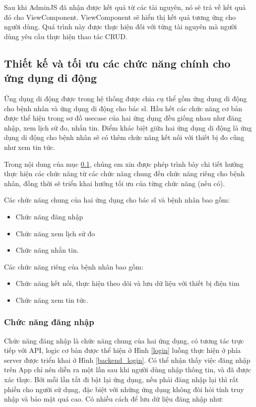 Sau khi AdminJS đã nhận được kết quả từ các tài nguyên, nó sẽ trả về kết quả đó cho ViewComponent. ViewComponent sẽ hiển thị kết quả tương ứng cho người dùng. Quá trình này được thực hiện đối với từng tài nguyên mà người dùng yêu cầu thực hiện thao tác CRUD.





\subsection{Thiết kế và tối ưu các chức năng chính cho ứng dụng di động}
\label{design_function_mobile}

Ứng dụng di động được trong hệ thống được chia cụ thể gồm ứng dụng di động cho bệnh nhân và ứng dụng di động cho bác sĩ. 
Hầu hết các chức năng cơ bản được thể hiện trong sơ đồ usecase của hai ứng dụng đều giống nhau như đăng nhập, xem lịch sử đo, nhắn tin.
Điểm khác biệt giữa hai ứng dụng di động là ứng dụng di động cho bệnh nhân sẽ có thêm chức năng kết nối với thiết bị đo cũng như xem tin tức.

Trong nội dung của mục \ref{design_function_mobile}, chúng em xin được phép trình bày chi tiết hướng thực hiện các chức năng
từ các chức năng chung đến chức năng riêng cho bệnh nhân, đồng thời sẽ triển khai hướng tối ưu của từng chức năng (nếu có).

Các chức năng chung của hai ứng dụng cho bác sĩ và bệnh nhân bao gồm: 
\begin{itemize}
  \item Chức năng đăng nhập
  \item Chức năng xem lịch sử đo
  \item Chức năng nhắn tin.
\end{itemize}

Các chức năng riêng của bệnh nhân bao gồm:
\begin{itemize}
  \item Chức năng kết nối, thực hiện theo dõi và lưu dữ liệu với thiết bị điện tim
  \item Chức năng xem tin tức.
\end{itemize}

\subsubsection{Chức năng đăng nhập}


Chức năng đăng nhập là chức năng chung của hai ứng dụng, có tương tác trực tiếp với API, logic cơ bản được thể hiện ở Hình \ref{login}
luồng thực hiện ở phía server được triển khai ở 
Hình \ref{backend_login}. Có thể nhận thấy việc đăng nhập trên App chỉ nên diễn ra một lần sau khi người dùng nhập thông tin,
và đã được xác thực. Bởi mỗi lần tắt đi bật lại ứng dụng, nếu phải đăng nhập lại thì rất phiền cho người sử dụng, đặc biệt
với những ứng dụng không đòi hỏi tính truy nhập và bảo mật quá cao. Có nhiều cách để lưu dữ liệu đăng nhập như:

